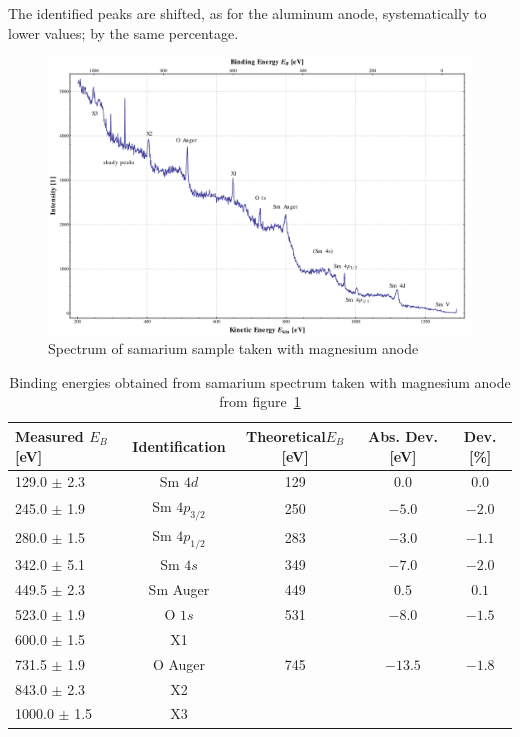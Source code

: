 \documentclass[a4paper,10pt]{scrartcl}
\begin{document}
The identified peaks are shifted, as for the aluminum anode, systematically to lower values; by the same percentage.

\begin{figure}[h]
\centering
\includegraphics[scale=0.3]{img/samarium_binding_mg}
\caption{Spectrum of samarium sample taken with magnesium anode \label{fig:sm_mg}}
\end{figure}

\begin{table}[h]
\begin{center}
\begin{tabular}{lcccc}
\toprule
Measured $E_{B}$ [eV]      & Identification & Theoretical$E_{B}$ [eV] & Abs. Dev. [eV] & Dev. [\%]\\
\midrule
\phantom{0}129.0 $\pm$ 2.3 & Sm $4d$        & 129                     & $0.0$          & $0.0$ \\
\phantom{0}245.0 $\pm$ 1.9 & Sm $4p_{3/2}$  & 250                     & $-5.0$         & $-2.0$\\
\phantom{0}280.0 $\pm$ 1.5 & Sm $4p_{1/2}$  & 283                     & $-3.0$         & $-1.1$\\
\phantom{0}342.0 $\pm$ 5.1 & Sm $4s$        & 349                     & $-7.0$         & $-2.0$\\
\phantom{0}449.5 $\pm$ 2.3 & Sm Auger       & 449                     & $0.5$          & $0.1$ \\
\phantom{0}523.0 $\pm$ 1.9 & O $1s$         & 531                     & $-8.0$         & $-1.5$\\
\phantom{0}600.0 $\pm$ 1.5 & X1             &                         &                &       \\
\phantom{0}731.5 $\pm$ 1.9 & O Auger        & 745                     & $-13.5$        & $-1.8$\\
\phantom{0}843.0 $\pm$ 2.3 & X2             &                         &                &       \\
1000.0 $\pm$ 1.5           & X3             &                         &                &       \\
\bottomrule
\end{tabular}
\end{center}
\par
\caption{Binding energies obtained from samarium spectrum taken with magnesium anode from figure~\ref{fig:sm_mg} \label{tab:sm_mg_ident}}
\end{table}
\end{document}
